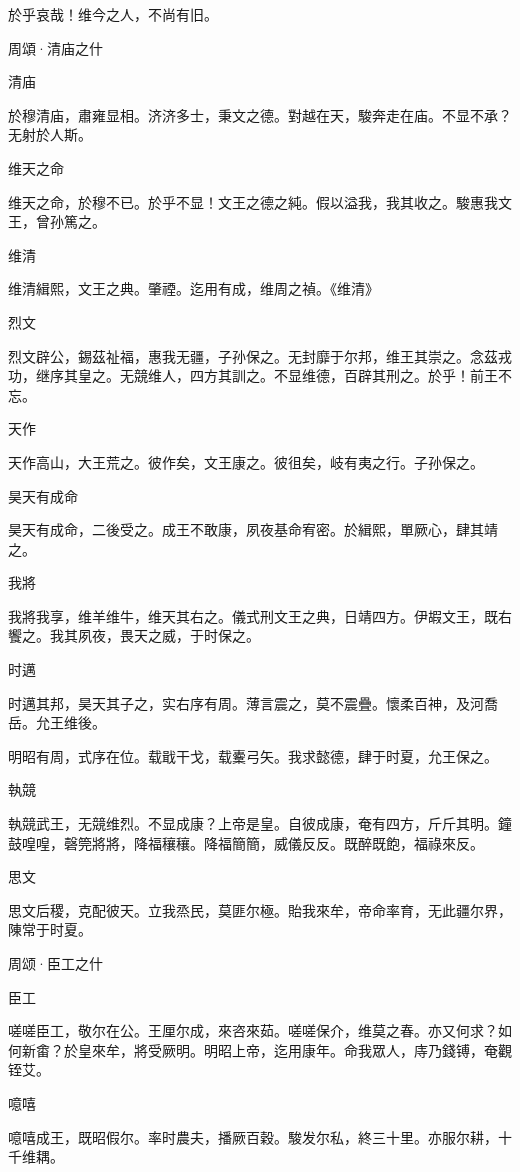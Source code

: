 於乎哀哉！维今之人，不尚有旧。




周頌·清庙之什

清庙

於穆清庙，肅雍显相。济济多士，秉文之德。對越在天，駿奔走在庙。不显不承？无射於人斯。

维天之命

维天之命，於穆不已。於乎不显！文王之德之純。假以溢我，我其收之。駿惠我文王，曾孙篤之。

维清

维清緝熙，文王之典。肇禋。迄用有成，维周之禎。《维清》

烈文

烈文辟公，錫茲祉福，惠我无疆，子孙保之。无封靡于尔邦，维王其崇之。念茲戎功，继序其皇之。无競维人，四方其訓之。不显维德，百辟其刑之。於乎！前王不忘。

天作

天作高山，大王荒之。彼作矣，文王康之。彼徂矣，岐有夷之行。子孙保之。

昊天有成命

昊天有成命，二後受之。成王不敢康，夙夜基命宥密。於緝熙，單厥心，肆其靖之。

我將

我將我享，维羊维牛，维天其右之。儀式刑文王之典，日靖四方。伊嘏文王，既右饗之。我其夙夜，畏天之威，于时保之。

时邁

时邁其邦，昊天其子之，实右序有周。薄言震之，莫不震疊。懷柔百神，及河喬岳。允王维後。

明昭有周，式序在位。载戢干戈，载櫜弓矢。我求懿德，肆于时夏，允王保之。

執競

執競武王，无競维烈。不显成康？上帝是皇。自彼成康，奄有四方，斤斤其明。鐘鼓喤喤，磬筦將將，降福穰穰。降福簡簡，威儀反反。既醉既飽，福祿來反。

思文

思文后稷，克配彼天。立我烝民，莫匪尔極。貽我來牟，帝命率育，无此疆尔界，陳常于时夏。




周颂·臣工之什


臣工

嗟嗟臣工，敬尔在公。王厘尔成，來咨來茹。嗟嗟保介，维莫之春。亦又何求？如何新畬？於皇來牟，將受厥明。明昭上帝，迄用康年。命我眾人，庤乃錢镈，奄觀铚艾。

噫嘻

噫嘻成王，既昭假尔。率时農夫，播厥百穀。駿发尔私，終三十里。亦服尔耕，十千维耦。

